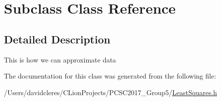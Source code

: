 \hypertarget{class_subclass}{}\section{Subclass Class Reference}
\label{class_subclass}


\subsection{Detailed Description}
This is how we can approximate data 

The documentation for this class was generated from the following file\+:\begin{DoxyCompactItemize}
\item 
/\+Users/davidcleres/\+C\+Lion\+Projects/\+P\+C\+S\+C2017\+\_\+\+Group5/\mbox{\hyperlink{_least_squares_8h}{Least\+Squares.\+h}}\end{DoxyCompactItemize}
